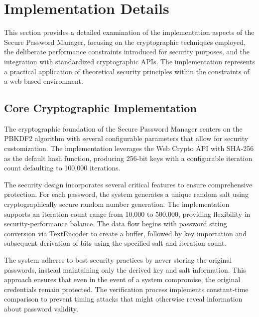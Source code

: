 \documentclass[11pt,a4paper]{article}
\begin{document}
\section{Implementation Details}
This section provides a detailed examination of the implementation aspects of the Secure Password Manager, focusing on the cryptographic techniques employed, the deliberate performance constraints introduced for security purposes, and the integration with standardized cryptographic APIs. The implementation represents a practical application of theoretical security principles within the constraints of a web-based environment.
\subsection{Core Cryptographic Implementation}
The cryptographic foundation of the Secure Password Manager centers on the PBKDF2 algorithm with several configurable parameters that allow for security customization. The implementation leverages the Web Crypto API with SHA-256 as the default hash function, producing 256-bit keys with a configurable iteration count defaulting to 100,000 iterations.


The security design incorporates several critical features to ensure comprehensive protection. For each password, the system generates a unique random salt using cryptographically secure random number generation. The implementation supports an iteration count range from 10,000 to 500,000, providing flexibility in security-performance balance. The data flow begins with password string conversion via TextEncoder to create a buffer, followed by key importation and subsequent derivation of bits using the specified salt and iteration count.


The system adheres to best security practices by never storing the original passwords, instead maintaining only the derived key and salt information. This approach ensures that even in the event of a system compromise, the original credentials remain protected. The verification process implements constant-time comparison to prevent timing attacks that might otherwise reveal information about password validity.
\end{document}
